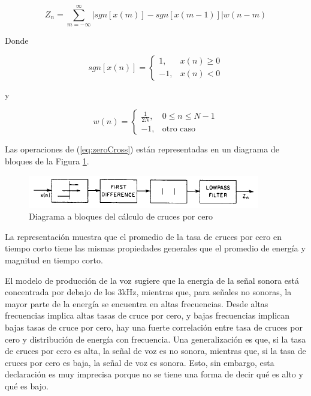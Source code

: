 \begin{equation}\label{eq:zeroCross}
	Z_n=\sum_{m=-\infty}^{\infty}{|sgn[x(m)]-sgn[x(m-1)]|w(n-m)}
\end{equation}

Donde

\begin{equation}\label{eq:promedio}
	sgn[x(n)]= 
\begin{cases}
    1,	& x(n)\geq0\\
    -1,              & x(n)<0
\end{cases}
\end{equation}

y

\begin{equation}\label{eq:promedio}
	w(n)= 
\begin{cases}
    \frac{1}{2N},	& 0\leq n\leq N-1\\
    -1,              & \text{otro caso}
\end{cases}
\end{equation}

Las operaciones de (\ref{eq:zeroCross}) están representadas en un diagrama de bloques de la Figura \ref{fig:crucesCero}.

\begin{figure}[H]
	\centering
	\includegraphics[width=0.6\linewidth]{figures/crucesCero}
	\caption{Diagrama a bloques del cálculo de cruces por cero}
	\label{fig:crucesCero}
\end{figure}

La representación muestra que el promedio de la tasa de cruces por cero en tiempo corto tiene las mismas propiedades generales que el promedio de energía y magnitud en tiempo corto.

El modelo de producción de la voz sugiere que la energía de la señal sonora está concentrada por debajo de los 3kHz, mientras que, para señales no sonoras, la mayor parte de la energía se encuentra en altas frecuencias. Desde altas frecuencias implica altas tasas de cruce por cero, y bajas frecuencias implican bajas tasas de cruce por cero, hay una fuerte correlación entre tasa de cruces por cero y distribución de energía con frecuencia. Una generalización es que, si la tasa de cruces por cero es alta, la señal de voz es no sonora, mientras que, si la tasa de cruces por cero es baja, la señal de voz es sonora. Esto, sin embargo, esta declaración es muy imprecisa porque no se tiene una forma de decir qué es alto y qué es bajo.


